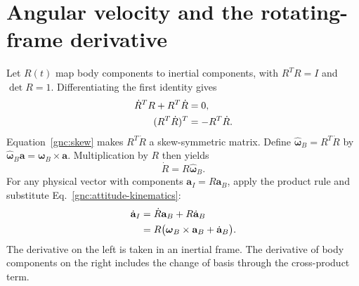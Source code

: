 

\section{Angular velocity and the rotating-frame derivative}
Let $R(t)$ map body components to inertial components, with
$R^{T}R=I$ and $\det R=1$. Differentiating the first identity gives
\begin{align}
 \dot R^{T}R+R^{T}\dot R&=0,\notag\\
 (R^{T}\dot R)^{T}&=-R^{T}\dot R.\label{gnc:skew}
\end{align}
Equation~\eqref{gnc:skew} makes $R^{T}\dot R$ a skew-symmetric matrix.
Define $\widehat{\boldsymbol\omega}_B=R^{T}\dot R$ by
$\widehat{\boldsymbol\omega}_B\mathbf a=\boldsymbol\omega_B\times\mathbf a$.
Multiplication by $R$ then yields
\begin{equation}\label{gnc:attitude-kinematics}
 \dot R=R\widehat{\boldsymbol\omega}_B.
\end{equation}
For any physical vector with components $\mathbf a_I=R\mathbf a_B$,
apply the product rule and substitute Eq.~\eqref{gnc:attitude-kinematics}:
\begin{align}
 \dot{\mathbf a}_I
 &=\dot R\mathbf a_B+R\dot{\mathbf a}_B\notag\\
 &=R\bigl(\boldsymbol\omega_B\times\mathbf a_B
                  +\dot{\mathbf a}_B\bigr).
 \label{gnc:transport}
\end{align}
The derivative on the left is taken in an inertial frame. The derivative of
body components on the right includes the change of basis through the
cross-product term.

